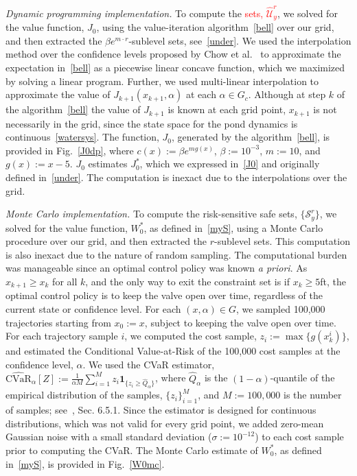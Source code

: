 \documentclass[letterpaper, 10 pt, conference]{ieeeconf}  %
\begin{document}
\textit{Dynamic programming implementation.}
To compute the \textcolor{red}{sets, $\widehat{\mathcal{U}}_y^r$}, 
we solved for the value function, $J_0$,
using the value-iteration algorithm~\eqref{bell} over our grid, and then extracted the $\beta e^{m \cdot r}$-sublevel sets, see~\eqref{under}.
We used the interpolation method over the confidence levels proposed by Chow et al.~\cite{chow2015risk} 
to approximate the expectation in~\eqref{bell}
as a piecewise linear concave function, which we maximized by solving a linear program.\footnotemark
{}
Further, we used multi-linear interpolation to approximate the value of $J_{k+1}(x_{k+1}, \alpha)$ at each $\alpha \in G_c$.
Although at step $k$ of the algorithm~\eqref{bell} the value of $J_{k+1}$ is known at each grid point,
$x_{k+1}$ is not necessarily in the grid, since the state space for the pond dynamics is continuous~\eqref{watersys}.
The function, $J_0$, generated by the algorithm~\eqref{bell}, is provided in Fig.~\ref{J0dp},
where $c(x) := \beta e^{m g(x)}$, $\beta := 10^{-3}$, $m := 10$, and $g(x):= x - 5$.
$J_0$ estimates $J_0^*$, which we expressed in~\eqref{J0} and originally defined in~\eqref{under}.  
The computation is inexact due to the interpolations over the grid.

\textit{Monte Carlo implementation.}
To compute the risk-sensitive safe sets, $\{\mathcal{S}_y^r\}$,
we solved for the value function, $W_0^*$, as defined in~\eqref{myS}, using a Monte Carlo procedure over our grid,
and then extracted the $r$-sublevel sets.
This computation is also inexact due to the nature of random sampling. 
The computational burden was manageable since an optimal control policy was known \textit{a priori}.
As $x_{k+1}\geq x_k$ for all $k$, and the only way to exit the constraint set is if $x_k \geq 5$ft,
the optimal control policy is to keep the valve open over time, regardless of the current state or confidence level.
For each $(x,\alpha) \in G$, we sampled 100,000 trajectories starting from $x_0 := x$, subject to keeping the valve open over time.
For each trajectory sample $i$, we computed the cost sample, $z_i := \max\{g(x_k^i)\}$, and estimated the Conditional Value-at-Risk
of the 100,000 cost samples at the confidence level, $\alpha$. 
We used the CVaR estimator, $\widehat{\text{CVaR}}_\alpha[Z] := \frac{1}{\alpha M}\sum_{i=1}^M z_i \textbf{1}_{\{z_i\geq \hat{Q}_\alpha\}}$,
where $\hat{Q}_\alpha$ is the $(1-\alpha)$-quantile of the empirical distribution of the samples, $\{z_i\}_{i=1}^M$,
and $M := 100,000$ is the number of samples; see~\cite{shapiro2009lectures}, Sec. 6.5.1.
Since the estimator is designed for continuous distributions, which was not valid for every grid point,
we added zero-mean Gaussian noise with a small standard deviation ($\sigma := 10^{-12}$) to each cost sample prior to computing the CVaR.
The Monte Carlo estimate of $W_0^*$, as defined in~\eqref{myS}, is provided in Fig.~\ref{W0mc}.
\end{document}
